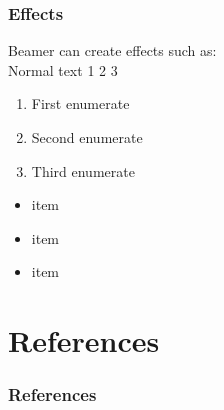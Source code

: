 \documentclass[aspectratio=169]{beamer}
\begin{document}
\begin{frame}
    \frametitle{Effects}
    Beamer can create effects such as:\\

        Normal text \alert<1-3>{ 1}\alert<2-3>{ 2}\alert<3>{ 3}
        
        
        
        
        \begin{enumerate}
        \item<1|alert@1> First enumerate
        \item<2> Second enumerate
        \item<3> Third enumerate
        \end{enumerate}
        
        \begin{itemize}[<+-| alert@+>]
                \item item
                \item item
                \item item
        \end{itemize}   
    
\end{frame}

\section{References}

\begin{frame}
    \frametitle{References}
    \printbibliography
\end{frame}
\end{document}
